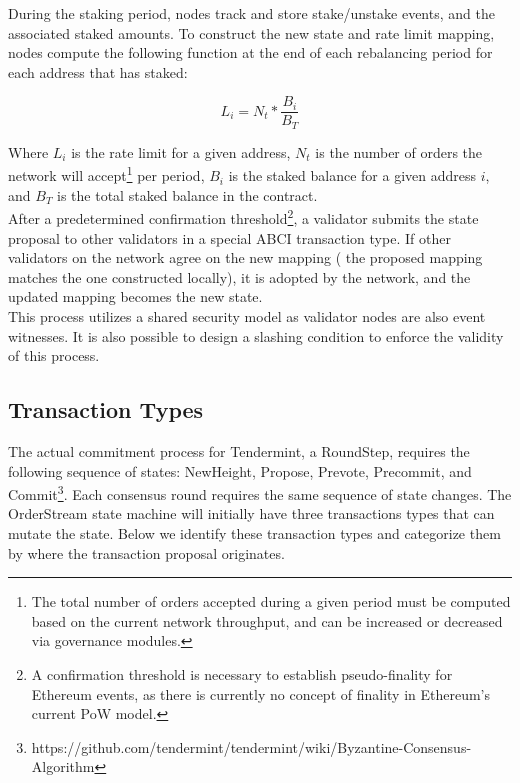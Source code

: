 \documentclass[9pt]{article}
\begin{document}
\noindent During the staking period, nodes track and store stake/unstake events, and the associated staked amounts. To construct the new state and rate limit mapping, nodes compute the following function at the end of each rebalancing period for each address that has staked:

\begin{equation}
L_i = N_t * \frac{B_i}{B_T}
\end{equation}

\noindent Where $L_i$ is the rate limit for a given address, $N_t$ is the number of orders the network will accept\footnote{The total number of orders accepted during a given period must be computed based on the current network throughput, and can be increased or decreased via governance modules.} per period, $B_i$  is the staked balance for a given address $i$, and $B_T$ is the total staked balance in the contract. \\

\noindent After a predetermined confirmation threshold\footnote{A confirmation threshold is necessary to establish pseudo-finality for Ethereum events, as there is currently no concept of finality in Ethereum’s current PoW model.}, a validator submits the state proposal to other validators in a special ABCI transaction type. If other validators on the network agree on the new mapping ( the proposed mapping matches the one constructed locally), it is adopted by the network, and the updated mapping becomes the new state. \\

\noindent This process utilizes a shared security model as validator nodes are also event witnesses. It is also possible to design a slashing condition to enforce the validity of this process.

\subsection{Transaction Types}\label{transactions}
\noindent The actual commitment process for Tendermint, a RoundStep, requires the following sequence of states: NewHeight, Propose, Prevote, Precommit, and Commit\footnote{https://github.com/tendermint/tendermint/wiki/Byzantine-Consensus-Algorithm}. Each consensus round requires the same sequence of state changes. The OrderStream state machine will initially have three transactions types that can mutate the state. Below we identify these transaction types and categorize them by where the transaction proposal originates.
\end{document}
